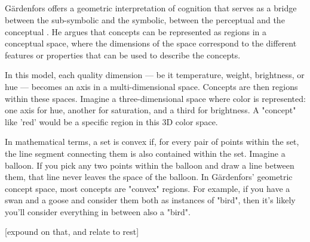 \subsection{ \label{subsec:gaerdenfors}}

Gärdenfors offers a geometric interpretation of cognition that serves as a bridge between the sub-symbolic and the symbolic, between the perceptual and the conceptual \cite{Gaerdenfors}. He argues that concepts can be represented as regions in a conceptual space, where the dimensions of the space correspond to the different features or properties that can be used to describe the concepts.

In this model, each quality dimension — be it temperature, weight, brightness, or hue — becomes an axis in a multi-dimensional space. Concepts are then regions within these spaces. Imagine a three-dimensional space where color is represented: one axis for hue, another for saturation, and a third for brightness. A "concept" like 'red' would be a specific region in this 3D color space.


In mathematical terms, a set is convex if, for every pair of points within the set, the line segment connecting them is also contained within the set. Imagine a balloon. If you pick any two points within the balloon and draw a line between them, that line never leaves the space of the balloon. In Gärdenfors' geometric concept space, most concepts are "convex" regions. For example, if you have a swan and a goose and consider them both as instances of "bird", then it's likely you'll consider everything in between also a "bird".


[expound on that, and relate to rest]




